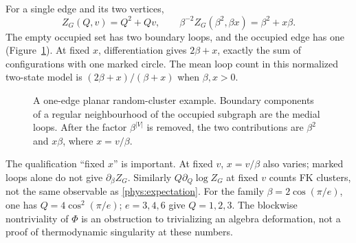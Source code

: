 \documentclass[a4paper,11pt,oneside,reqno]{amsart}
\theoremstyle{definition}
\numberwithin{equation}{section}
\begin{document}
For a single edge and its two vertices,
\[
 Z_G(Q,v)=Q^2+Qv,\qquad
 \beta^{-2}Z_G(\beta^2,\beta x)=\beta^2+x\beta.
\]
The empty occupied set has two boundary loops, and the occupied edge
has one (Figure~\ref{fig:phys-FK}). At fixed $x$, differentiation gives
$2\beta+x$, exactly the sum of configurations with one marked circle.
The mean loop count in this normalized two-state model is
$(2\beta+x)/(\beta+x)$ when $\beta,x>0$.
\begin{figure}[htbp]
\centering
{}
\caption{A one-edge planar random-cluster example. Boundary components of a regular neighbourhood of the occupied subgraph are the medial loops. After the factor $\beta^{|V|}$ is removed, the two contributions are $\beta^2$ and $x\beta$, where $x=v/\beta$.}
\label{fig:phys-FK}
\end{figure}

The qualification ``fixed $x$'' is important. At fixed $v$, $x=v/\beta$
also varies; marked loops alone do not give $\partial_\beta Z_G$.
Similarly $Q\partial_Q\log Z_G$ at fixed $v$ counts FK clusters,
not the same observable as \eqref{phys:expectation}.
For the family $\beta=2\cos(\pi/e)$, one has
$Q=4\cos^2(\pi/e)$; $e=3,4,6$ give $Q=1,2,3$.
The blockwise nontriviality of $\Phi$ is an obstruction to trivializing
an algebra deformation, not a proof of thermodynamic singularity at
these numbers.
\end{document}

